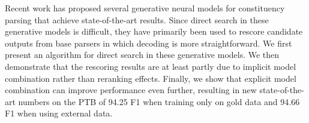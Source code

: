 Recent work has proposed several generative neural models for constituency parsing that achieve state-of-the-art results. Since direct search in these generative models is difficult, they have primarily been used to rescore candidate outputs from base parsers in which decoding is more straightforward. We first present an algorithm for direct search in these generative models.  We then demonstrate that the rescoring results are at least partly due to implicit model combination rather than reranking effects.  Finally, we show that explicit model combination can improve performance even further, resulting in new state-of-the-art numbers on the PTB of 94.25 F1 when training only on gold data and 94.66 F1 when using external data.
